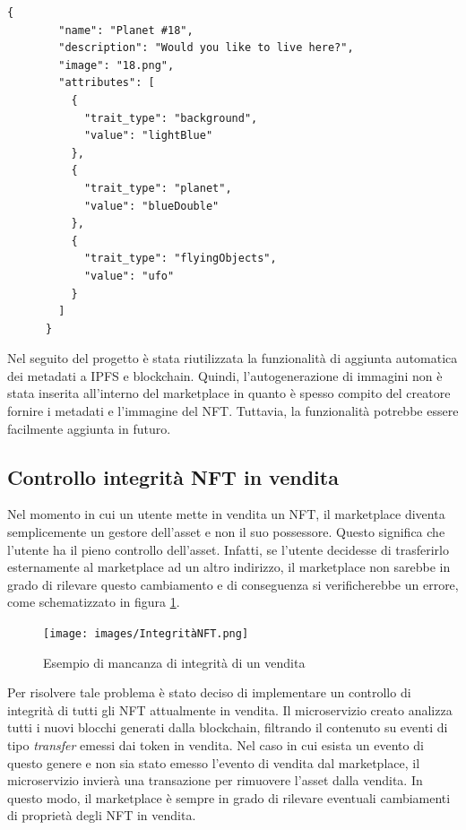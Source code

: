 \begin{lstlisting}[basicstyle=\small]
    {
        "name": "Planet #18",
        "description": "Would you like to live here?",
        "image": "18.png",
        "attributes": [
          {
            "trait_type": "background",
            "value": "lightBlue"
          },
          {
            "trait_type": "planet",
            "value": "blueDouble"
          },
          {
            "trait_type": "flyingObjects",
            "value": "ufo"
          }
        ]
      }
\end{lstlisting}

Nel seguito del progetto è stata riutilizzata la funzionalità di aggiunta automatica dei metadati a IPFS e blockchain. Quindi, l'autogenerazione di immagini non è stata inserita all'interno del marketplace in quanto è spesso compito del creatore fornire i metadati e l'immagine del NFT. Tuttavia, la funzionalità potrebbe essere facilmente aggiunta in futuro.

\subsection{Controllo integrità NFT in vendita}
\label{sec:controllo-integrita-nft-in-vendita}

Nel momento in cui un utente mette in vendita un NFT, il marketplace diventa semplicemente un gestore dell'asset e non il suo possessore. Questo significa che l'utente ha il pieno controllo dell'asset. Infatti, se l'utente decidesse di trasferirlo esternamente al marketplace ad un altro indirizzo, il marketplace non sarebbe in grado di rilevare questo cambiamento e di conseguenza si verificherebbe un errore, come schematizzato in figura \ref{fig:integrita-nft}.


\begin{figure}[H]
    \centering
    \texttt{[image: images/IntegritàNFT.png]}
    \caption{Esempio di mancanza di integrità di un vendita}
    \label{fig:integrita-nft}
\end{figure}

Per risolvere tale problema è stato deciso di implementare un controllo di integrità di tutti gli NFT attualmente in vendita. Il microservizio creato analizza tutti i nuovi blocchi generati dalla blockchain, filtrando il contenuto su eventi di tipo \textit{transfer} emessi dai token in vendita. Nel caso in cui esista un evento di questo genere e non sia stato emesso l'evento di vendita dal marketplace, il microservizio invierà una transazione per rimuovere l'asset dalla vendita. In questo modo, il marketplace è sempre in grado di rilevare eventuali cambiamenti di proprietà degli NFT in vendita.